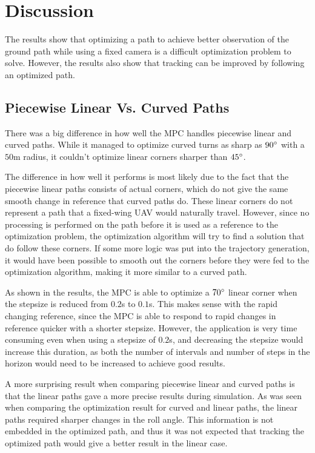 \chapter{Discussion}

The results show that optimizing a path to achieve better observation of the ground path while using a fixed camera is a difficult optimization problem to solve. However, the results also show that tracking can be improved by following an optimized path.

\section{Piecewise Linear Vs. Curved Paths}

There was a big difference in how well the MPC handles piecewise linear and curved paths. While it managed to optimize curved turns as sharp as $90\degree$ with a $50$m radius, it couldn't optimize linear corners sharper than $45\degree$.

The difference in how well it performs is most likely due to the fact that the piecewise linear paths consists of actual corners, which do not give the same smooth change in reference that curved paths do. These linear corners do not represent a path that a fixed-wing UAV would naturally travel. However, since no processing is performed on the path before it is used as a reference to the optimization problem, the optimization algorithm will try to find a solution that do follow these corners. If some more logic was put into the trajectory generation, it would have been possible to smooth out the corners before they were fed to the optimization algorithm, making it more similar to a curved path.

As shown in the results, the MPC is able to optimize a $70\degree$ linear corner when the stepsize is reduced from $0.2$s to $0.1$s. This makes sense with the rapid changing reference, since the MPC is able to respond to rapid changes in reference quicker with a shorter stepsize. However, the application is very time consuming even when using a stepsize of $0.2$s, and decreasing the stepsize would increase this duration, as both the number of intervals and number of steps in the horizon would need to be increased to achieve good results.

A more surprising result when comparing piecewise linear and curved paths is that the linear paths gave a more precise results during simulation. As was seen when comparing the optimization result for curved and linear paths, the linear paths required sharper changes in the roll angle. This information is not embedded in the optimized path, and thus it was not expected that tracking the optimized path would give a better result in the linear case.


